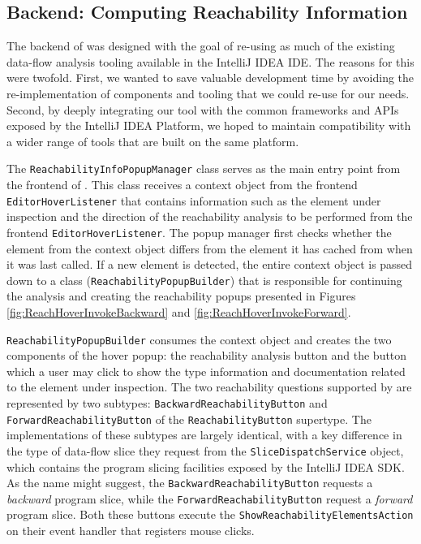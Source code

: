 \subsection{Backend: Computing Reachability Information}
\label{subsec:Backend}

The backend of \toolname{} was designed with the goal of re-using as much of
the existing data-flow analysis tooling available in the IntelliJ IDEA
\ac{IDE}.
The reasons for this were twofold.
First, we wanted to save valuable development time by avoiding 
the re-implementation of components and tooling that we could re-use for our
needs.
Second, by deeply integrating our tool with the common frameworks and 
\acp{API} exposed by the IntelliJ IDEA Platform, we hoped to maintain 
compatibility with a wider range of tools that are built on the same platform.

\par The \texttt{ReachabilityInfoPopupManager} class serves as the main entry
point from the frontend of \toolname{}.
This class receives a context object from the frontend \texttt{EditorHoverListener}
that contains information such as the element under inspection and the direction of the 
reachability analysis to be performed from the frontend \texttt{EditorHoverListener}.
The popup manager first checks whether the element from the context object
differs from the element it has cached from when it was last called.
If a new element is detected, the entire context object is passed down to a class
(\texttt{ReachabilityPopupBuilder})
that is responsible for continuing the analysis and creating the reachability
popups presented in Figures \ref{fig:ReachHoverInvokeBackward} and
\ref{fig:ReachHoverInvokeForward}.

\par \texttt{ReachabilityPopupBuilder} consumes the context object and creates
the two components of the hover popup: the reachability analysis button and the
button which a user may click to show the type information and documentation
related to the element under inspection.
The two reachability questions supported by \toolname{} are represented by two
subtypes: \texttt{BackwardReachabilityButton} and 
\texttt{ForwardReachabilityButton} of the \texttt{ReachabilityButton} supertype.
The implementations of these subtypes are largely identical, with a key 
difference in the type of data-flow slice they request from the
\texttt{SliceDispatchService} object, which contains the program slicing
facilities exposed by the IntelliJ IDEA \ac{SDK}.
As the name might suggest, the \texttt{BackwardReachabilityButton} requests a
\textit{backward} program slice, while the 
\texttt{ForwardReachabilityButton} request a \textit{forward} program slice.
Both these buttons execute the \texttt{ShowReachabilityElementsAction} on their
event handler that registers mouse clicks.

